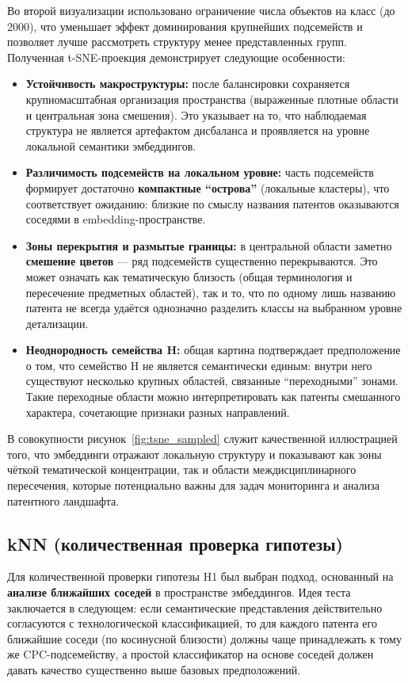 \documentclass{article}
\begin{document}
Во второй визуализации использовано ограничение числа объектов на класс (до 2000), что уменьшает эффект доминирования крупнейших подсемейств и позволяет лучше рассмотреть структуру менее представленных групп. Полученная t-SNE-проекция демонстрирует следующие особенности:

\begin{itemize}
  \item \textbf{Устойчивость макроструктуры:} после балансировки сохраняется крупномасштабная организация пространства (выраженные плотные области и центральная зона смешения). Это указывает на то, что наблюдаемая структура не является артефактом дисбаланса и проявляется на уровне локальной семантики эмбеддингов.
  \item \textbf{Различимость подсемейств на локальном уровне:} часть подсемейств формирует достаточно \textbf{компактные ``острова''} (локальные кластеры), что соответствует ожиданию: близкие по смыслу названия патентов оказываются соседями в embedding-пространстве.
  \item \textbf{Зоны перекрытия и размытые границы:} в центральной области заметно \textbf{смешение цветов} — ряд подсемейств существенно перекрываются. Это может означать как тематическую близость (общая терминология и пересечение предметных областей), так и то, что по одному лишь названию патента не всегда удаётся однозначно разделить классы на выбранном уровне детализации.
  \item \textbf{Неоднородность семейства H:} общая картина подтверждает предположение о том, что семейство H не является семантически единым: внутри него существуют несколько крупных областей, связанные ``переходными'' зонами. Такие переходные области можно интерпретировать как патенты смешанного характера, сочетающие признаки разных направлений.
\end{itemize}

В совокупности рисунок~\ref{fig:tsne_sampled} служит качественной иллюстрацией того, что эмбеддинги отражают локальную структуру и показывают как зоны чёткой тематической концентрации, так и области междисциплинарного пересечения, которые потенциально важны для задач мониторинга и анализа патентного ландшафта.

\subsection{kNN (количественная проверка гипотезы)}
Для количественной проверки гипотезы H1 был выбран подход, основанный на \textbf{анализе ближайших соседей} в пространстве эмбеддингов. Идея теста заключается в следующем: если семантические представления действительно согласуются с технологической классификацией, то для каждого патента его ближайшие соседи (по косинусной близости) должны чаще принадлежать к тому же CPC-подсемейству, а простой классификатор на основе соседей должен давать качество существенно выше базовых предположений.
\end{document}
